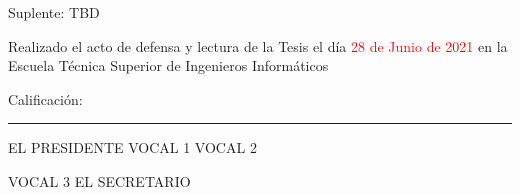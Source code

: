 \documentclass[twoside,11pt,table,xcdraw]{Latex/Classes/PhDthesisPSnPDF}
\begin{document}
\vspace{5mm}
Suplente: \hspace{1.5mm} TBD%

\vspace{10mm}
\noindent Realizado el acto de defensa y lectura de la Tesis el d\'{i}a \textcolor{red}{28 de Junio de 2021} en la Escuela T\'ecnica Superior de Ingenieros Inform\'aticos

\vspace{5mm}
\noindent Calificaci\'{o}n: \rule{123mm}{0.2mm}
\vspace{20mm}

EL PRESIDENTE \hspace{30mm} VOCAL 1 \hspace{30mm} VOCAL 2

\vspace{30mm}
\hspace{15mm} VOCAL 3 \hspace{45mm} EL SECRETARIO





\cleardoublepage

\cleardoublepage




\cleardoublepage


%   


\cleardoublepage
\setcounter{secnumdepth}{3} %
\setcounter{tocdepth}{2}    %
\tableofcontents           %
\end{document}
